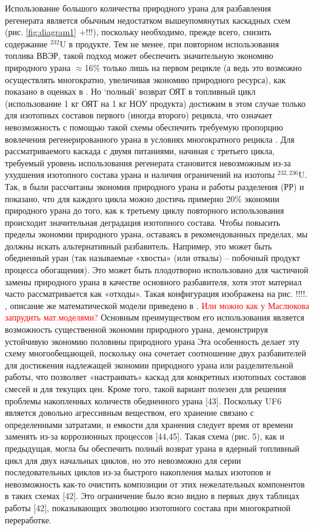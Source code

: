Использование большого количества природного урана для разбавления регенерата является обычным недостатком вышеупомянутых каскадных схем (рис. \ref{fig:diagram1} +!!!), поскольку необходимо, прежде всего, снизить содержание $^{232}$U в продукте. Тем не менее, при повторном использования топлива ВВЭР, такой подход может обеспечить значительную экономию природного урана $\approx$16\% только лишь на первом рецикле (а ведь это возможно осуществлять многократно, увеличивая экономию природного ресурса), как показано в оценках в \cite{smirnovEvolutionIsotopicComposition2012}. Но `полный' возврат ОЯТ в топливный цикл (использование 1 кг ОЯТ на 1 кг НОУ продукта) достижим в этом случае только для изотопных составов первого (иногда второго) рецикла, что означает невозможность с помощью такой схемы обеспечить требуемую пропорцию вовлечения регенерированного урана в условиях многократного рецикла \cite{smirnovApplyingEnrichmentCapacities2018}.
Для рассматриваемого каскада с двумя питаниями, начиная с третьего цикла, требуемый уровень использования регенерата становится невозможным из-за ухудшения изотопного состава урана и наличия ограничений на изотопы $^{232,236}$U.
Так, в \cite{smirnovApplyingEnrichmentCapacities2018} были рассчитаны экономия природного урана и работы разделения (РР) и показано, что для каждого цикла можно достичь примерно 20\% экономии природного урана до того, как к третьему циклу повторного использования происходит значительная деградация изотопного состава.
Чтобы повысить пределы экономии природного урана, оставаясь в рекомендованных пределах, мы должны искать альтернативный разбавитель. Например, это может быть обедненный уран (так называемые «хвосты» (или отвалы) -- побочный продукт процесса обогащения). Это может быть плодотворно использовано для частичной замены природного урана в качестве основного разбавителя, хотя этот материал часто рассматривается как «отходы». Такая конфигурация изображена на рис. !!!!. , описание же математической модели приведено в \cite{smirnovEnrichmentRegeneratedUranium2014} .
\textcolor{red}{Или можно как у Маслюкова запрудить мат.моделями?}
Основным преимуществом его использования является возможность существенной экономии природного урана, демонстрируя устойчивую экономию половины природного урана
Эта особенность делает эту схему многообещающей, поскольку она сочетает соотношение двух разбавителей для достижения надлежащей экономии природного урана или разделительной работы, что позволяет «настраивать» каскад для конкретных изотопных составов смесей и для текущих цен. Кроме того, такой вариант полезен для решения проблемы накопленных количеств обедненного урана [43]. Поскольку UF6 является довольно агрессивным веществом, его хранение связано с определенными затратами, и емкости для хранения следует время от времени заменять из-за коррозионных процессов [44,45].
Такая схема (рис. 5), как и предыдущая, могла бы обеспечить полный возврат урана в ядерный топливный цикл для двух начальных циклов, но это невозможно для серии последовательных циклов из-за быстрого накопления малых изотопов и невозможность как-то очистить композиции от этих нежелательных компонентов в таких схемах [42]. Это ограничение было ясно видно в первых двух таблицах работы [42], показывающих эволюцию изотопного состава при многократной переработке.

